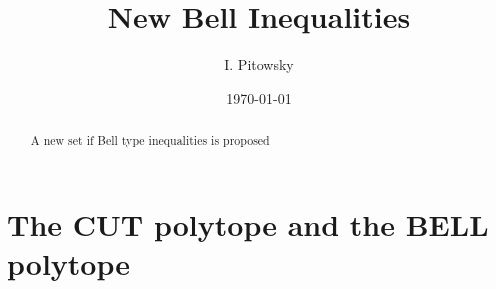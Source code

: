 


\newtheorem{theorem}{Theorem}
\newtheorem{acknowledgement}[theorem]{Acknowledgement}
\newtheorem{algorithm}[theorem]{Algorithm}
\newtheorem{axiom}[theorem]{Axiom}
\newtheorem{claim}[theorem]{Claim}
\newtheorem{conclusion}[theorem]{Conclusion}
\newtheorem{condition}[theorem]{Condition}
\newtheorem{conjecture}[theorem]{Conjecture}
\newtheorem{corollary}[theorem]{Corollary}
\newtheorem{criterion}[theorem]{Criterion}
\newtheorem{definition}[theorem]{Definition}
\newtheorem{example}[theorem]{Example}
\newtheorem{exercise}[theorem]{Exercise}
\newtheorem{lemma}[theorem]{Lemma}
\newtheorem{notation}[theorem]{Notation}
\newtheorem{problem}[theorem]{Problem}
\newtheorem{proposition}[theorem]{Proposition}
\newtheorem{remark}[theorem]{Remark}
\newtheorem{solution}[theorem]{Solution}
\newtheorem{summary}[theorem]{Summary}


\title{New Bell Inequalities}
\author{I. Pitowsky}
\address{The Hebrew University}
\date{\today}
\maketitle
\pacs{}

\begin{abstract}
A new set if Bell type inequalities is proposed
\end{abstract}

\section{The CUT polytope and the BELL polytope}

